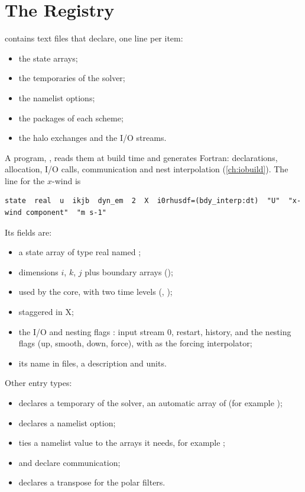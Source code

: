 \section{The Registry}

 contains text files that declare, one line per item:
\begin{itemize}
  \item the state arrays;
  \item the temporaries of the solver;
  \item the namelist options;
  \item the packages of each scheme;
  \item the halo exchanges and the I/O streams.
\end{itemize}
A program, , reads them at build time and generates Fortran: declarations, allocation,
I/O calls, communication and nest interpolation (\cref{ch:iobuild}). The line for the $x$-wind is
\begin{lstlisting}[language={}]
state  real  u  ikjb  dyn_em  2  X  i0rhusdf=(bdy_interp:dt)  "U"  "x-wind component"  "m s-1"
\end{lstlisting}
Its fields are:
\begin{itemize}
  \item a state array of type real named ;
  \item dimensions $i$, $k$, $j$ plus boundary arrays ();
  \item used by the  core, with two time levels (, );
  \item staggered in X;
  \item the I/O and nesting flags : input stream 0, restart, history, and the nesting flags (up, smooth,
    down, force), with  as the forcing interpolator;
  \item its name in files, a description and units.
\end{itemize}
Other entry types:
\begin{itemize}
  \item {} declares a temporary of the solver, an automatic array of  (for example
    );
  \item {} declares a namelist option;
  \item {} ties a namelist value to the arrays it needs, for example
    ;
  \item {} and  declare communication;
  \item {} declares a transpose for the polar filters.
\end{itemize}

